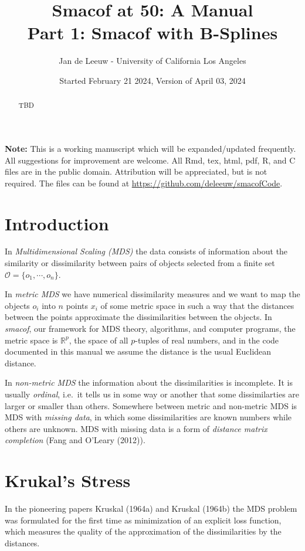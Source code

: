 \documentclass[
  12pt,
]{article}
\title{Smacof at 50: A Manual\\
Part 1: Smacof with B-Splines}
\author{Jan de Leeuw - University of California Los Angeles}
\date{Started February 21 2024, Version of April 03, 2024}
\newcommand{\sectionbreak}{\clearpage}
\begin{document}
\maketitle
\begin{abstract}
TBD
\end{abstract}

{
\setcounter{tocdepth}{4}
\tableofcontents
}
\textbf{Note:} This is a working manuscript which will be expanded/updated
frequently. All suggestions for improvement are welcome. All Rmd, tex,
html, pdf, R, and C files are in the public domain. Attribution will be
appreciated, but is not required. The files can be found at
\url{https://github.com/deleeuw/smacofCode}.

\sectionbreak

\section{Introduction}\label{introduction}

In \emph{Multidimensional Scaling (MDS)} the data consists of information
about the similarity or dissimilarity between pairs of objects selected
from a finite set \(\mathcal{O}=\{o_1,\cdots,o_n\}\).

In \emph{metric MDS} we have numerical dissimilarity measures and we want to
map the objects \(o_i\) into \(n\) points \(x_i\) of some metric space in such
a way that the distances between the points approximate the
dissimilarities between the objects. In \emph{smacof}, our framework for MDS
theory, algorithms, and computer programs, the metric space is
\(\mathbb{R}^p\), the space of all \(p\)-tuples of real numbers, and in the
code documented in this manual we assume the distance is the usual
Euclidean distance.

In \emph{non-metric MDS} the information about the dissimilarities is
incomplete. It is usually \emph{ordinal}, i.e.~it tells us in some way or
another that some dissimilarties are larger or smaller than others.
Somewhere between metric and non-metric MDS is MDS with \emph{missing data},
in which some dissimilarities are known numbers while others are
unknown. MDS with missing data is a form of \emph{distance matrix completion}
(Fang and O'Leary (2012)).

\section{Krukal's Stress}\label{krukals-stress}

In the pioneering papers Kruskal (1964a) and Kruskal (1964b) the MDS problem
was formulated for the first time as minimization of an explicit loss
function, which measures the quality of the approximation of the
dissimilarities by the distances.
\end{document}

